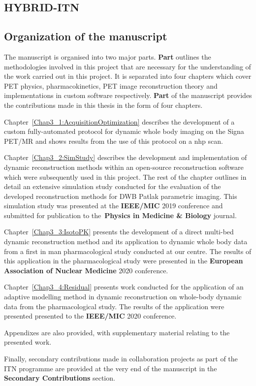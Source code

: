 \subsection*{HYBRID-ITN}


\subsection*{Organization of the manuscript}
The manuscript is organised into two major parts. \textbf{Part } outlines the methodologies involved in this project that are necessary for the understanding of the work carried out in this project. It is separated into four chapters which cover PET physics, pharmacokinetics, PET image reconstruction theory and implementations in custom software respectively. \textbf{Part } of the manuscript provides the contributions made in this thesis in the form of four chapters.

Chapter~\ref{Chap3_1:AcquisitionOptimization} describes the development of a custom fully-automated protocol for dynamic whole body imaging on the Signa PET/MR and shows results from the use of this protocol on a \gls{nhp} scan.

Chapter~\ref{Chap3_2:SimStudy} describes the development and implementation of dynamic reconstruction methods within an open-source reconstruction software which were subsequently used in this project. The rest of the chapter outlines in detail an extensive simulation study conducted for the evaluation of the developed reconstruction methods for DWB Patlak parametric imaging. This simulation study was presented at the \textbf{IEEE/MIC} 2019 conference and submitted for publication to the~\textbf{Physics in Medicine \& Biology} journal. 

Chapter~\ref{Chap3_3:IsotoPK} presents the development of a direct multi-bed dynamic reconstruction method and its application to dynamic whole body data from a first in man pharmacological study conducted at our centre. The results of this application in the pharmacological study were presented in the \textbf{European Association of Nuclear Medicine} 2020 conference.

Chapter~\ref{Chap3_4:Residual} presents work conducted for the application of an adaptive modelling method in dynamic reconstruction on whole-body dynamic data from the pharmacological study. The results of the application were presented presented to the \textbf{IEEE/MIC} 2020 conference.

Appendixes are also provided, with supplementary material relating to the presented work. 

Finally, secondary contributions made in collaboration projects as part of the ITN programme are provided at the very end of the manuscript in the \textbf{Secondary Contributions} section.